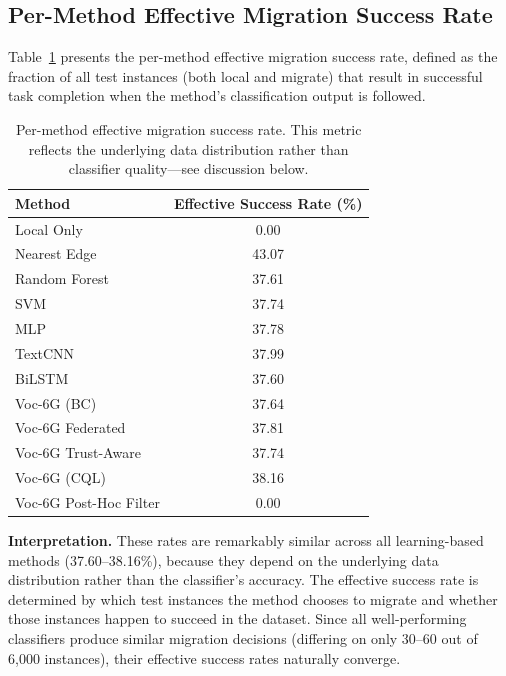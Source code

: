 \documentclass[journal,twoside]{IEEEtran}
\begin{document}
\subsection{Per-Method Effective Migration Success Rate}

Table~\ref{tab:success_rates} presents the per-method effective migration success rate, defined as the fraction of all test instances (both local and migrate) that result in successful task completion when the method's classification output is followed.

\begin{table}[t]
\centering
\caption{Per-method effective migration success rate. This metric reflects the underlying data distribution rather than classifier quality---see discussion below.}
\label{tab:success_rates}
\small
\begin{tabular}{lc}
\toprule
\textbf{Method} & \textbf{Effective Success Rate (\%)} \\
\midrule
Local Only              & 0.00 \\
Nearest Edge            & 43.07 \\
Random Forest           & 37.61 \\
SVM                     & 37.74 \\
MLP                     & 37.78 \\
TextCNN                 & 37.99 \\
BiLSTM                  & 37.60 \\
Voc-6G (BC)             & 37.64 \\
Voc-6G Federated        & 37.81 \\
Voc-6G Trust-Aware      & 37.74 \\
Voc-6G (CQL)            & 38.16 \\
Voc-6G Post-Hoc Filter  & 0.00 \\
\bottomrule
\end{tabular}
\end{table}

\textbf{Interpretation.} These rates are remarkably similar across all learning-based methods (37.60--38.16\%), because they depend on the underlying data distribution rather than the classifier's accuracy. The effective success rate is determined by which test instances the method chooses to migrate and whether those instances happen to succeed in the dataset. Since all well-performing classifiers produce similar migration decisions (differing on only 30--60 out of 6,000 instances), their effective success rates naturally converge.
\end{document}
